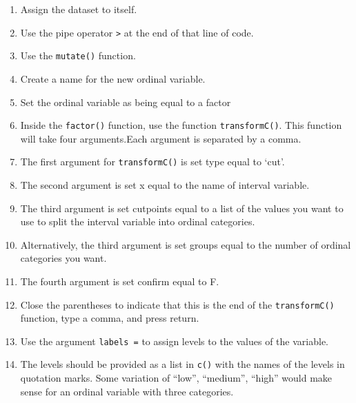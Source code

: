 \documentclass[
]{book}
\providecommand{\tightlist}{%
  \setlength{\itemsep}{0pt}\setlength{\parskip}{0pt}}
\begin{document}
\begin{enumerate}
\def\labelenumi{\arabic{enumi}.}
\tightlist
\item
  Assign the dataset to itself.
\item
  Use the pipe operator \texttt{\textbar{}\textgreater{}} at the end of that line of code.
\item
  Use the \texttt{mutate()} function.
\item
  Create a name for the new ordinal variable.
\item
  Set the ordinal variable as being equal to a factor
\item
  Inside the \texttt{factor()} function, use the function \texttt{transformC()}. This function will take four arguments.Each argument is separated by a comma.
\item
  The first argument for \texttt{transformC()} is set type equal to `cut'.
\item
  The second argument is set x equal to the name of interval variable.
\item
  The third argument is set cutpoints equal to a list of the values you want to use to split the interval variable into ordinal categories.
\item
  Alternatively, the third argument is set groups equal to the number of ordinal categories you want.
\item
  The fourth argument is set confirm equal to F.
\item
  Close the parentheses to indicate that this is the end of the \texttt{transformC()} function, type a comma, and press return.
\item
  Use the argument \texttt{labels\ =} to assign levels to the values of the variable.
\item
  The levels should be provided as a list in \texttt{c()} with the names of the levels in quotation marks. Some variation of ``low'', ``medium'', ``high'' would make sense for an ordinal variable with three categories.
\end{enumerate}
\end{document}
